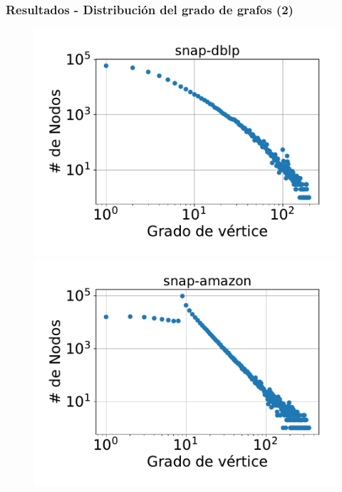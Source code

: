 \begin{frame}%
\frametitle{Resultados - Distribución del grado de grafos (2)}

\begin{figure}
    \centering
    	\begin{minipage}{1\textwidth}
    		\centering
    		\begin{minipage}{0.45\textwidth}
    			\centering
    			\includegraphics[width=1\linewidth]{../img/grades/snap-dblp.pdf}
    		\end{minipage}
    		\begin{minipage}{0.45\textwidth}
    			\centering
    			\includegraphics[width=1\linewidth]{../img/grades/snap-amazon.pdf}
    		\end{minipage}  		
    	\end{minipage}
    	

\end{figure}
\end{frame}
